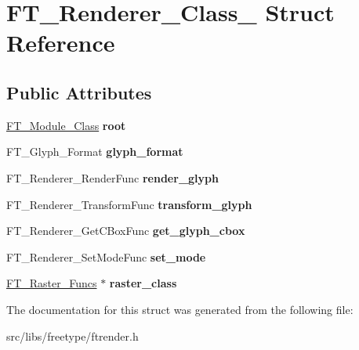 \hypertarget{struct_f_t___renderer___class__}{
\section{FT\_\-Renderer\_\-Class\_\- Struct Reference}
\label{struct_f_t___renderer___class__}
}
\subsection*{Public Attributes}
\begin{DoxyCompactItemize}
\item 
\hypertarget{struct_f_t___renderer___class___a3df4509f1de704596bf4237d6ff8cbd4}{
\hyperlink{struct_f_t___module___class__}{FT\_\-Module\_\-Class} {\bfseries root}}
\label{struct_f_t___renderer___class___a3df4509f1de704596bf4237d6ff8cbd4}

\item 
\hypertarget{struct_f_t___renderer___class___a2c8602452fae27379a6f85bbcb4b525c}{
FT\_\-Glyph\_\-Format {\bfseries glyph\_\-format}}
\label{struct_f_t___renderer___class___a2c8602452fae27379a6f85bbcb4b525c}

\item 
\hypertarget{struct_f_t___renderer___class___a7a022b8358ce3a06620c62f3542d0d2b}{
FT\_\-Renderer\_\-RenderFunc {\bfseries render\_\-glyph}}
\label{struct_f_t___renderer___class___a7a022b8358ce3a06620c62f3542d0d2b}

\item 
\hypertarget{struct_f_t___renderer___class___a2aef09ecdabacf5628ef29fb3d179def}{
FT\_\-Renderer\_\-TransformFunc {\bfseries transform\_\-glyph}}
\label{struct_f_t___renderer___class___a2aef09ecdabacf5628ef29fb3d179def}

\item 
\hypertarget{struct_f_t___renderer___class___a4f9dc9b6d86504a8d3b04b4e72936e76}{
FT\_\-Renderer\_\-GetCBoxFunc {\bfseries get\_\-glyph\_\-cbox}}
\label{struct_f_t___renderer___class___a4f9dc9b6d86504a8d3b04b4e72936e76}

\item 
\hypertarget{struct_f_t___renderer___class___a7cfd4795107157aad4f7efcab77a0f64}{
FT\_\-Renderer\_\-SetModeFunc {\bfseries set\_\-mode}}
\label{struct_f_t___renderer___class___a7cfd4795107157aad4f7efcab77a0f64}

\item 
\hypertarget{struct_f_t___renderer___class___a5af75b9f582f98f9f74dbcbc530c7e88}{
\hyperlink{struct_f_t___raster___funcs__}{FT\_\-Raster\_\-Funcs} $\ast$ {\bfseries raster\_\-class}}
\label{struct_f_t___renderer___class___a5af75b9f582f98f9f74dbcbc530c7e88}

\end{DoxyCompactItemize}


The documentation for this struct was generated from the following file:\begin{DoxyCompactItemize}
\item 
src/libs/freetype/ftrender.h\end{DoxyCompactItemize}
